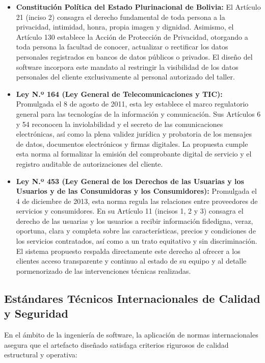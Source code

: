 \begin{itemize}
    \item \textbf{Constitución Política del Estado Plurinacional de Bolivia:} El Artículo 21 (inciso 2) consagra el derecho fundamental de toda persona a la privacidad, intimidad, honra, propia imagen y dignidad. Asimismo, el Artículo 130 establece la Acción de Protección de Privacidad, otorgando a toda persona la facultad de conocer, actualizar o rectificar los datos personales registrados en bancos de datos públicos o privados. El diseño del software incorpora este mandato al restringir la visibilidad de los datos personales del cliente exclusivamente al personal autorizado del taller.
    \item \textbf{Ley N.º 164 (Ley General de Telecomunicaciones y TIC):} Promulgada el 8 de agosto de 2011, esta ley establece el marco regulatorio general para las tecnologías de la información y comunicación. Sus Artículos 6 y 54 reconocen la inviolabilidad y el secreto de las comunicaciones electrónicas, así como la plena validez jurídica y probatoria de los mensajes de datos, documentos electrónicos y firmas digitales. La propuesta cumple esta norma al formalizar la emisión del comprobante digital de servicio y el registro auditable de autorizaciones del cliente.
    \item \textbf{Ley N.º 453 (Ley General de los Derechos de las Usuarias y los Usuarios y de las Consumidoras y los Consumidores):} Promulgada el 4 de diciembre de 2013, esta norma regula las relaciones entre proveedores de servicios y consumidores. En su Artículo 11 (incisos 1, 2 y 3) consagra el derecho de las usuarias y los usuarios a recibir información fidedigna, veraz, oportuna, clara y completa sobre las características, precios y condiciones de los servicios contratados, así como a un trato equitativo y sin discriminación. El sistema propuesto respalda directamente este derecho al ofrecer a los clientes acceso transparente y continuo al estado de su equipo y al detalle pormenorizado de las intervenciones técnicas realizadas.
\end{itemize}

\subsection{Estándares Técnicos Internacionales de Calidad y Seguridad}

En el ámbito de la ingeniería de software, la aplicación de normas internacionales asegura que el artefacto diseñado satisfaga criterios rigurosos de calidad estructural y operativa:

